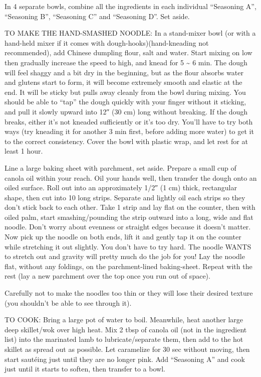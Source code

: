 \documentclass[]{article}
\begin{document}
In 4 separate bowls, combine all the ingredients in each individual ``Seasoning A'', ``Seasoning B'', ``Seasoning C'' and ``Seasoning D''. Set aside.

TO MAKE THE HAND-SMASHED NOODLE: In a stand-mixer bowl (or with a hand-held mixer if it comes with dough-hooks)(hand-kneading not recommended), add Chinese dumpling flour, salt and water. Start mixing on low then gradually increase the speed to high, and knead for 5 \textasciitilde{} 6 min. The dough will feel shaggy and a bit dry in the beginning, but as the flour absorbs water and glutens start to form, it will become extremely smooth and elastic at the end. It will be sticky but pulls away cleanly from the bowl during mixing. You should be able to ``tap'' the dough quickly with your finger without it sticking, and pull it slowly upward into 12″ (30 cm) long without breaking. If the dough breaks, either it's not kneaded sufficiently or it's too dry. You'll have to try both ways (try kneading it for another 3 min first, before adding more water) to get it to the correct consistency. Cover the bowl with plastic wrap, and let rest for at least 1 hour.

Line a large baking sheet with parchment, set aside. Prepare a small cup of canola oil within your reach. Oil your hands well, then transfer the dough onto an oiled surface. Roll out into an approximately 1/2″ (1 cm) thick, rectangular shape, then cut into 10 long strips. Separate and lightly oil each strips so they don't stick back to each other. Take 1 strip and lay flat on the counter, then with oiled palm, start smashing/pounding the strip outward into a long, wide and flat noodle. Don't worry about evenness or straight edges because it doesn't matter. Now pick up the noodle on both ends, lift it and gently tap it on the counter while stretching it out slightly. You don't have to try hard. The noodle WANTS to stretch out and gravity will pretty much do the job for you! Lay the noodle flat, without any foldings, on the parchment-lined baking-sheet. Repeat with the rest (lay a new parchment over the top once you run out of space).

Carefully not to make the noodles too thin or they will lose their desired texture (you shouldn't be able to see through it).

TO COOK: Bring a large pot of water to boil. Meanwhile, heat another large deep skillet/wok over high heat. Mix 2 tbsp of canola oil (not in the ingredient list) into the marinated lamb to lubricate/separate them, then add to the hot skillet as spread out as possible. Let caramelize for 30 sec without moving, then start sautéing just until they are no longer pink. Add ``Seasoning A'' and cook just until it starts to soften, then transfer to a bowl.
\end{document}
